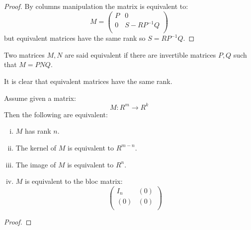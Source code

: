 \begin{proof}
By columns manipulation the matrix is equivalent to:
\[M = \begin{pmatrix}
P & 0  \\
0 & S - RP^{-1}Q \\
\end{pmatrix}\]
but equivalent matrices have the same rank so $S=RP^{-1}Q$.
\end{proof}

\begin{definition}
Two matrices $M,N$ are said equivalent if there are invertible matrices $P,Q$ such that $M = PNQ$.
\end{definition}

It is clear that equivalent matrices have the same rank.

\begin{lemma}\label{rank-equivalent-definitions}
Assume given a matrix:
\[M : R^m\to R^k\]
Then the following are equivalent:
\begin{enumerate}[(i)]
\item $M$ has rank $n$.
\item The kernel of $M$ is equivalent to $R^{m-n}$.
\item The image of $M$ is equivalent to $R^n$.
\item $M$ is equivalent to the bloc matrix:
\[\begin{pmatrix}
I_n & (0)  \\
(0) & (0) \\
\end{pmatrix}\]
\end{enumerate}
\end{lemma}

\begin{proof}
\end{proof}






